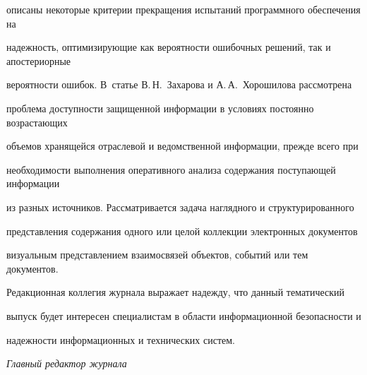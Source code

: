 описаны некоторые критерии прекращения испытаний программного обеспечения на 


надежность, оптимизирующие как вероятности ошибочных решений, так и апостериорные 


вероятности ошибок. В~статье В.\,Н.~Захарова и А.\,А.~Хорошилова рассмотрена 


проблема доступности защищенной ин\-фор\-мации в условиях постоянно возрастающих 


объемов хранящейся отрас\-ле\-вой и ведомственной информации, прежде всего при 


необходимости выполнения оперативного анализа содержания поступающей информации 


из разных источников. Рассматривается задача наглядного и структурированного 


представления содержания одного или целой коллекции электронных документов 


визуальным представлением взаимосвязей объектов, событий или тем доку\-ментов. 


{





}


     


     \bigskip


     


     Редакционная коллегия журнала выражает надежду, что данный тематический 


выпуск будет интересен специалистам в области информационной безопасности и 


надежности информационных и технических систем.





\vspace*{12pt}





  \label{end\stat}


     


     


\noindent


\textit{Главный редактор журнала}\\[-13pt]


     


\noindent


